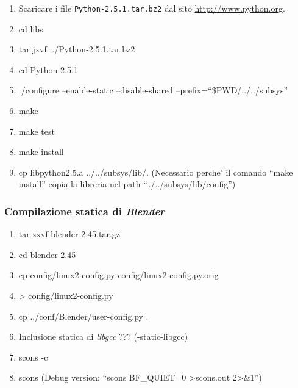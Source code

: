 \begin{enumerate}
\item Scaricare i file \texttt{Python-2.5.1.tar.bz2} dal sito \href{http://www.python.org}{http://www.python.org}.
\item cd libs
\item tar jxvf ../Python-2.5.1.tar.bz2
\item cd Python-2.5.1
\item ./configure --enable-static --disable-shared --prefix=``\$PWD/../../subsys''
\item make
\item make test
\item make install
\item cp libpython2.5.a ../../subsys/lib/.
\newline
{\small
(Necessario perche' il comando ``make install'' copia la libreria nel path ``../../subsys/lib/config'')
}
\end{enumerate}

\subsubsection{Compilazione statica di \emph{Blender}} \label{sssec:blender-blender}

\begin{enumerate}
\item tar zxvf blender-2.45.tar.gz
\item cd blender-2.45
\item cp config/linux2-config.py config/linux2-config.py.orig
\item > config/linux2-config.py
\item cp ../conf/Blender/user-config.py .
\item Inclusione statica di \emph{libgcc} ??? (-static-libgcc)
\item scons -c
\item scons
\newline
{\small
(Debug version: ``scons BF\_QUIET=0 >scons.out 2>\&1'')
}
\end{enumerate}
